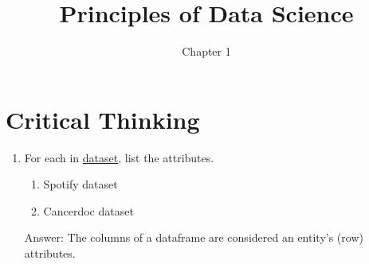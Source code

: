 \documentclass[]{article}
\title{Principles of Data Science}
\author{Chapter 1}
\begin{document}
\maketitle


\section{Critical Thinking}

\begin{enumerate}
	\item For each in \href{https://openstax.org/r/spreadsheetsd1}{dataset}, list the attributes.
		\begin{enumerate}
			\item Spotify dataset
			\item Cancerdoc dataset
		\end{enumerate}
		
		Answer:
		The columns of a dataframe are considered an entity's (row) attributes.
\end{enumerate}
\end{document}
